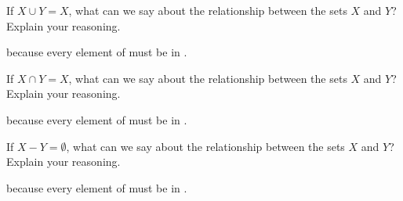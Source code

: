 \documentclass[nooutcomes]{ximera}
\begin{document}
\begin{problem}
If $X\cup Y = X$, what can we say about the relationship between the sets $X$ and $Y$? Explain your reasoning.

because every element of  must be in .

\end{problem}

\begin{problem}
If $X\cap Y = X$, what can we say about the relationship between the sets $X$ and $Y$? Explain your reasoning.

because every element of  must be in .
\end{problem}

\begin{problem}
If $X-Y =\emptyset$, what can we say about the relationship between the sets $X$ and $Y$? Explain your reasoning.

because every element of  must be in .
\end{problem}
\end{document}
